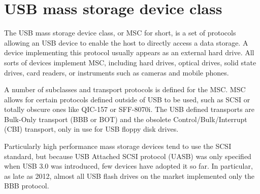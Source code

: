 
    \section{USB mass storage device class}
        The USB mass storage device class, or MSC for short, is a set of protocols allowing an USB device to enable the host to directly access a data storage.  A device implementing this protocol usually appears as an external hard drive.  All sorts of devices implement MSC, including hard drives, optical drives, solid state drives, card readers, or instruments such as cameras and mobile phones\cite{usb-keil-msc}.
        
        A number of subclasses and transport protocols is defined for the MSC.  MSC allows for certain protocols defined outside of USB to be used, such as SCSI or totally obscure ones like QIC-157 or SFF-8070i.  The USB defined transports are Bulk-Only transport (BBB or BOT) and the obsolete Control/Bulk/Interrupt (CBI) transport, only in use for USB floppy disk drives\cite{usb-mass-storage}\cite{usb-mass-bulk}.
        
        Particularly high performance mass storage devices tend to use the SCSI standard\cite{usb-electronicdesign-usb-uasp-bot}, but because USB Attached SCSI protocol (UASB) was only specified when USB 3.0 was introduced, few devices have adopted it so far\cite{usb-winaero-usb-scsi-uas}.  In particular, as late as 2012, almost all USB flash drives on the market implemented only the BBB protocol\cite{usb-qemu-usb-storage}.
        

